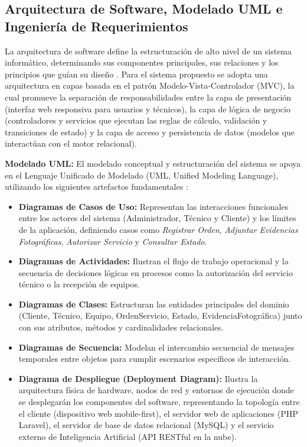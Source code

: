\subsection{Arquitectura de Software, Modelado UML e Ingeniería de Requerimientos}

La arquitectura de software define la estructuración de alto nivel de un sistema informático, determinando sus componentes principales, sus relaciones y los principios que guían su diseño \cite{pressman2021}. Para el sistema propuesto se adopta una arquitectura en capas basada en el patrón Modelo-Vista-Controlador (MVC), la cual promueve la separación de responsabilidades entre la capa de presentación (interfaz web responsiva para usuarios y técnicos), la capa de lógica de negocio (controladores y servicios que ejecutan las reglas de cálculo, validación y transiciones de estado) y la capa de acceso y persistencia de datos (modelos que interactúan con el motor relacional).

\textbf{Modelado UML:} El modelado conceptual y estructuración del sistema se apoya en el Lenguaje Unificado de Modelado (UML, Unified Modeling Language), utilizando los siguientes artefactos fundamentales \cite{pilone2018}:

\begin{itemize}
    \item \textbf{Diagramas de Casos de Uso:} Representan las interacciones funcionales entre los actores del sistema (Administrador, Técnico y Cliente) y los límites de la aplicación, definiendo casos como \textit{Registrar Orden}, \textit{Adjuntar Evidencias Fotográficas}, \textit{Autorizar Servicio} y \textit{Consultar Estado}.
    \item \textbf{Diagramas de Actividades:} Ilustran el flujo de trabajo operacional y la secuencia de decisiones lógicas en procesos como la autorización del servicio técnico o la recepción de equipos.
    \item \textbf{Diagramas de Clases:} Estructuran las entidades principales del dominio (Cliente, Técnico, Equipo, OrdenServicio, Estado, EvidenciaFotográfica) junto con sus atributos, métodos y cardinalidades relacionales.
    \item \textbf{Diagramas de Secuencia:} Modelan el intercambio secuencial de mensajes temporales entre objetos para cumplir escenarios específicos de interacción.
    \item \textbf{Diagrama de Despliegue (Deployment Diagram):} Ilustra la arquitectura física de hardware, nodos de red y entornos de ejecución donde se desplegarán los componentes del software, representando la topología entre el cliente (dispositivo web mobile-first), el servidor web de aplicaciones (PHP Laravel), el servidor de base de datos relacional (MySQL) y el servicio externo de Inteligencia Artificial (API RESTful en la nube).
\end{itemize}

